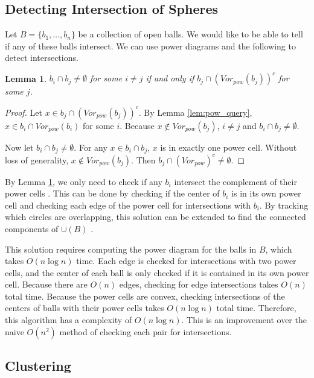 \documentclass[a4paper, 11pt]{article}
\newtheorem{lemma}{Lemma}[section]
\begin{document}
\subsection{Detecting Intersection of Spheres}

Let $B = \{ b_1,\dots, b_n \}$ be a collection of open balls. We would like to be able to tell if any of these balls intersect. We can use power
diagrams and the following to detect intersections.

\begin{lemma}
  $b_i \cap b_j \neq \emptyset$ for some $i \neq j$ if and only if $b_j \cap (Vor_{pow}(b_j))^c$ for some $j$.
  \label{lem:ball_intersect}
\end{lemma}
\begin{proof}
  Let $x \in b_j \cap ( Vor_{pow}(b_j))^c$. By Lemma \ref{lem:pow_query}, $x \in b_i \cap Vor_{pow}(b_i)$ for some $i$. Because $x \not\in
  Vor_{pow}(b_j)$, $i \neq j$ and $b_i \cap b_j \neq \emptyset$.

  Now let $b_i \cap b_j \neq \emptyset$. For any $x \in b_i \cap b_j$, $x$ is in exactly one power cell. Without loss of generality, $x \not\in
  Vor_{pow}(b_j)$. Then $b_j \cap (Vor_{pow})^c \neq \emptyset$.
\end{proof}

By Lemma \ref{lem:ball_intersect}, we only need to check if any $b_i$ intersect the complement of their power cells \cite{aurenhammer_discs}. This can
be done by checking if the center of $b_i$ is in its own power cell and checking each edge of the power cell for intersections with $b_i$.
By tracking which circles are overlapping, this solution can be extended to find the connected components of $\cup (B)$ \cite{imai_power}.

This solution requires computing the power diagram for the balls in $B$, which takes $O(n \log n)$ time. Each edge is checked for intersections with
two power cells, and the center of each ball is only checked if it is contained in its own power cell. Because there are $O(n)$ edges, checking for
edge intersections takes $O(n)$ total time. Because the power cells are convex, checking intersections of the centers of balls with their power cells
takes $O(n \log n)$ total time. Therefore, this algorithm has a complexity of $O(n \log n)$. This is an improvement over the naive $O(n^2)$ method of
checking each pair for intersections.


\subsection{Clustering}
\end{document}
